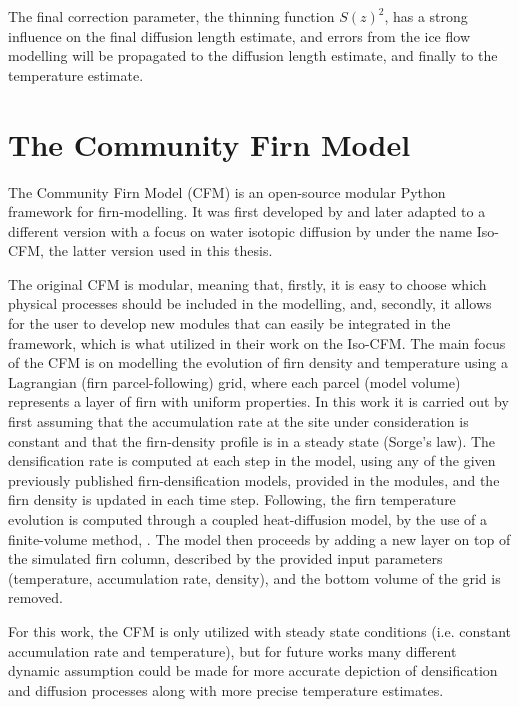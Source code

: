 \documentclass[../../CompleteThesis2/Complete_2ndDraft]{subfiles}
\begin{document}
The final correction parameter, the thinning function $S(z)^2$, has a strong influence on the final diffusion length estimate, and errors from the ice flow modelling will be propagated to the diffusion length estimate, and finally to the temperature estimate. %

\section[CFM]{The Community Firn Model}
\label{Sec:Ice_CFM}
The Community Firn Model (CFM) is an open-source modular Python framework for firn-modelling. It was first developed  by \cite[Stevens et al, 2020]{Stevens2020} and later adapted to a different version with a focus on water isotopic diffusion by \cite[Gkinis et al, 2019]{Gkinis2019} under the name Iso-CFM, the latter version used in this thesis. 

The original CFM is modular, meaning that, firstly, it is easy to choose which physical processes should be included in the modelling, and, secondly, it allows for the user to develop new modules that can easily be integrated in the framework, which is what \cite{Gkinis2019} utilized in their work on the Iso-CFM. The main focus of the CFM is on modelling the evolution of firn density and temperature using a Lagrangian (firn parcel-following) grid, where each parcel (model volume) represents a layer of firn with uniform properties. In this work it is carried out by first assuming that the accumulation rate at the site under consideration is constant and that the firn-density profile is in a steady state (Sorge's law). The densification rate is computed at each step in the model, using any of the given previously published firn-densification models, provided in the modules, and the firn density is updated in each time step. Following, the firn temperature evolution is computed through a coupled heat-diffusion model, by the use of a finite-volume method, \cite[Patankar, 1980]{Patankar1980}. The model then proceeds by adding a new layer on top of the simulated firn column, described by the provided input parameters (temperature, accumulation rate, density), and the bottom volume of the grid is removed. 

For this work, the CFM is only utilized with steady state conditions (i.e. constant accumulation rate and temperature), but for future works many different dynamic assumption could be made for more accurate depiction of densification and diffusion processes along with more precise temperature estimates.
\end{document}
